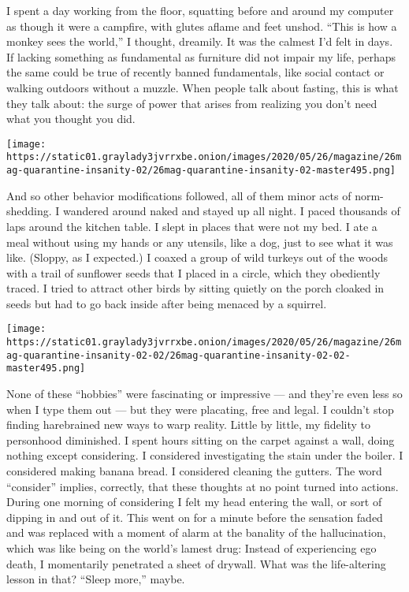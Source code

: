 I spent a day working from the floor, squatting before and around my
computer as though it were a campfire, with glutes aflame and feet
unshod. ``This is how a monkey sees the world,'' I thought, dreamily. It
was the calmest I'd felt in days. If lacking something as fundamental as
furniture did not impair my life, perhaps the same could be true of
recently banned fundamentals, like social contact or walking outdoors
without a muzzle. When people talk about fasting, this is what they talk
about: the surge of power that arises from realizing you don't need what
you thought you did.

\texttt{[image: https://static01.graylady3jvrrxbe.onion/images/2020/05/26/magazine/26mag-quarantine-insanity-02/26mag-quarantine-insanity-02-master495.png]}

And so other behavior modifications followed, all of them minor acts of
norm-shedding. I wandered around naked and stayed up all night. I paced
thousands of laps around the kitchen table. I slept in places that were
not my bed. I ate a meal without using my hands or any utensils, like a
dog, just to see what it was like. (Sloppy, as I expected.) I coaxed a
group of wild turkeys out of the woods with a trail of sunflower seeds
that I placed in a circle, which they obediently traced. I tried to
attract other birds by sitting quietly on the porch cloaked in seeds but
had to go back inside after being menaced by a squirrel.

\texttt{[image: https://static01.graylady3jvrrxbe.onion/images/2020/05/26/magazine/26mag-quarantine-insanity-02-02/26mag-quarantine-insanity-02-02-master495.png]}

None of these ``hobbies'' were fascinating or impressive --- and they're
even less so when I type them out --- but they were placating, free and
legal. I couldn't stop finding harebrained new ways to warp reality.
Little by little, my fidelity to personhood diminished. I spent hours
sitting on the carpet against a wall, doing nothing except considering.
I considered investigating the stain under the boiler. I considered
making banana bread. I considered cleaning the gutters. The word
``consider'' implies, correctly, that these thoughts at no point turned
into actions. During one morning of considering I felt my head entering
the wall, or sort of dipping in and out of it. This went on for a minute
before the sensation faded and was replaced with a moment of alarm at
the banality of the hallucination, which was like being on the world's
lamest drug: Instead of experiencing ego death, I momentarily penetrated
a sheet of drywall. What was the life-altering lesson in that? ``Sleep
more,'' maybe.

